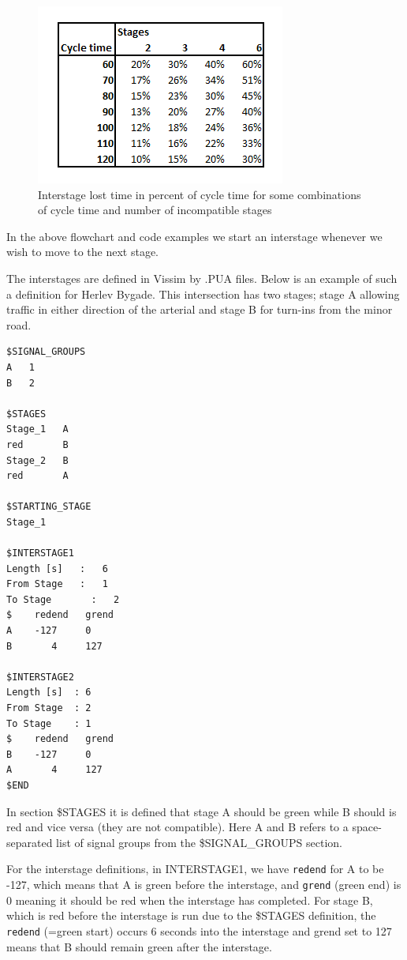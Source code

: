 \begin{figure}[htbp]
\centering
\includegraphics[scale=0.6]{interstage_lost_time.png} 
\caption{Interstage lost time in percent of cycle time for some combinations of cycle time and number of incompatible stages}
\label{fig:lost_time_example}
\end{figure}

In the above flowchart and code examples we start an interstage whenever we wish to move to the next stage.

The interstages are defined in Vissim by .PUA files. Below is an example of such a definition for Herlev Bygade. This intersection has two stages; stage A allowing traffic in either direction of the arterial and stage B for turn-ins from the minor road. 

\begin{verbatim}
$SIGNAL_GROUPS
A   1
B   2

$STAGES
Stage_1   A
red       B
Stage_2   B
red       A

$STARTING_STAGE
Stage_1

$INTERSTAGE1
Length [s]	 :   6
From Stage	 :   1
To Stage	   :   2
$    redend   grend
A    -127     0
B       4     127

$INTERSTAGE2
Length [s]	: 6
From Stage	: 2
To Stage	: 1
$    redend   grend
B    -127     0
A       4     127
$END
\end{verbatim}

In section \$STAGES it is defined that stage A should be green while B should is red and vice versa (they are not compatible). Here A and B refers to a space-separated list of signal groups from the \$SIGNAL\_GROUPS section.

For the interstage definitions, in INTERSTAGE1, we have \verb|redend| for A to be -127, which means that A is green before the interstage, and \verb|grend| (green end) is 0 meaning it should be red when the interstage has completed. For stage B, which is red before the interstage is run due to the \$STAGES definition, the \verb|redend| (=green start) occurs 6 seconds into the interstage and grend set to 127 means that B should remain green after the interstage.

